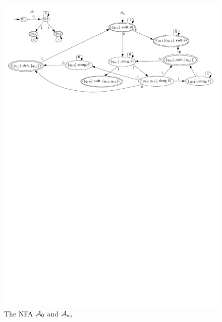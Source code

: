 \begin{example}
\begin{figure}[htbp]
\begin{center}
\includegraphics[scale=0.7]{regular-expression-example.pdf}
\end{center}
\caption{The NFA $\mathcal{A}_0$ and $\mathcal{A}_{e_0}$}\label{fig-pa-re}
\end{figure} 
\end{example}

